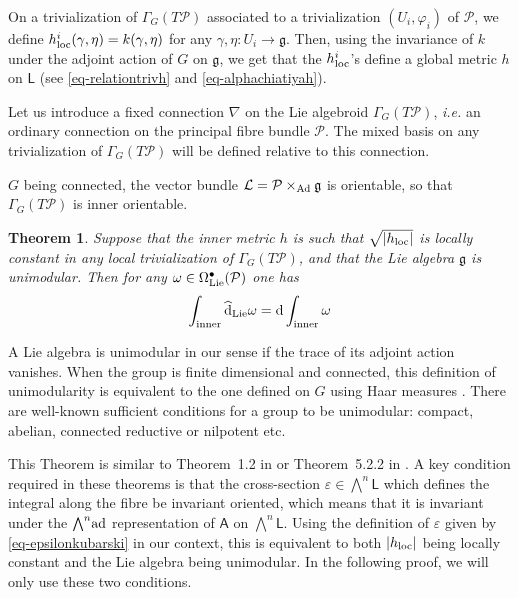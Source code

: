 \documentclass[number]{elsarticle}
\newtheorem{theorem}{Theorem}[section]
\theoremstyle{definition}
\theoremstyle{remark}
\numberwithin{equation}{section}
\begin{document}
On a trivialization of $\Gamma_G(T{{{{\mathcal{{P}}}}}})$ associated to a trivialization $(U_i, \varphi_i)$ of ${{{{\mathcal{{P}}}}}}$, we define $h^i_{{\text{\textup{loc}}}}(\gamma,\eta) = k(\gamma, \eta)$ for any $\gamma, \eta : U_i \rightarrow {{\mathfrak g}}$. Then, using the invariance of $k$ under the adjoint action of $G$ on ${{\mathfrak g}}$, we get that the $h^i_{{\text{\textup{loc}}}}$'s define a global metric $h$ on ${{{{\mathbf{\mathsf{{L}}}}}}}$ (see \eqref{eq-relationtrivh} and \eqref{eq-alphachiatiyah}).

Let us introduce a fixed connection $\nabla$ on the Lie algebroid $\Gamma_G(T{{{{\mathcal{{P}}}}}})$, \textsl{i.e.} an ordinary connection on the principal fibre bundle ${{{{\mathcal{{P}}}}}}$. The mixed basis on any trivialization of $\Gamma_G(T{{{{\mathcal{{P}}}}}})$ will be defined relative to this connection. 

$G$ being connected, the vector bundle ${{\mathcal L}} = {{{{\mathcal{{P}}}}}} \times_{{\text{\textup{Ad}}}} {{\mathfrak g}}$ is orientable, so that $\Gamma_G(T{{{{\mathcal{{P}}}}}})$ is inner orientable.

\begin{theorem}
\label{thm-atiyah-commutationofdifferentials}
Suppose that the inner metric $h$ is such that $\sqrt{|h_{{\text{\textup{loc}}}}|}$ is locally constant in any local trivialization of $\Gamma_G(T{{{{\mathcal{{P}}}}}})$, and that the Lie algebra ${{\mathfrak g}}$ is unimodular. Then for any $\omega \in \Omega^{\bullet}_{{\text{\textup{Lie}}}}({{{{\mathcal{{P}}}}}})$ one has
\begin{equation*}
\int_{{\text{\textup{inner}}}} {\widehat{\text{\textup{d}}}}_{{\text{\textup{Lie}}}} \omega = {\text{\textup{d}}} \int_{{\text{\textup{inner}}}} \omega
\end{equation*}
\end{theorem}

A Lie algebra is unimodular in our sense if the trace of its adjoint action vanishes. When the group is finite dimensional and connected, this definition of unimodularity is equivalent to the one defined on $G$ using Haar measures \cite{Bour72b}. There are well-known sufficient conditions for a group to be unimodular: compact, abelian, connected reductive or nilpotent etc.

This Theorem is similar to Theorem~1.2 in \cite{MR1908998} or Theorem~5.2.2 in \cite{Kuba96a}. A key condition required in these theorems is that the cross-section $\varepsilon \in {{\textstyle\bigwedge}}^n {{{{\mathbf{\mathsf{{L}}}}}}}$ which defines the integral along the fibre be invariant oriented, which means that it is invariant under the ${{\textstyle\bigwedge}}^n {{\text{\textup{ad}}}}$ representation of ${{{{\mathbf{\mathsf{{A}}}}}}}$ on ${{\textstyle\bigwedge}}^n {{{{\mathbf{\mathsf{{L}}}}}}}$. Using the definition of $\varepsilon$ given by \eqref{eq-epsilonkubarski} in our context, this is equivalent to both $|h_{{\text{\textup{loc}}}}|$ being locally constant and the Lie algebra being unimodular. In the following proof, we will only use these two conditions. 
\end{document}

